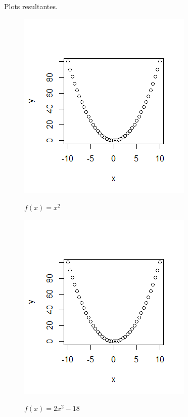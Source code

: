 \documentclass[12pt, a4paper]{article}
\begin{document}



Plots resultantes.


\begin{figure}[H]
	\caption{$f(x) = x^2$}
	\centering
	\includegraphics[scale=1]{images/function1.png}
	\label{fig:function1}
\end{figure}

\begin{figure}[H]
	\caption{$f(x) = 2x^2 - 18$}
	\centering
	\includegraphics[scale=1]{images/function1.png}
	\label{fig:function2}
\end{figure}
\end{document}
